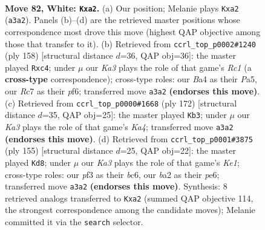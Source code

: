 \documentclass[11pt]{article}
\begin{document}
\clearpage

\begin{figure}[p]\centering
\begin{subfigure}{0.46\textwidth}\centering
\resizebox{\linewidth}{!}{%
\newchessgame
\chessboard[
  setfen={6k1/B1R5/r7/8/B3p2p/K4p1P/b4P2/8 w - - 74 82},
  showmover=false,
  pgfstyle=straightmove, color=movearrow, markmove={a3-a2}
]}
\caption{}
\end{subfigure}\hfill
\begin{subfigure}{0.46\textwidth}\centering
\resizebox{\linewidth}{!}{%
\newchessgame
\chessboard[
  setfen={2n5/8/rB3p2/P3k3/2b4p/7P/5K2/2R5 w - - 0 80},
  showmover=false,
  pgfstyle=straightmove, color=movearrow, markmove={c1-c4}
]}
\caption{}
\end{subfigure}
\\[4pt]
\begin{subfigure}{0.46\textwidth}\centering
\resizebox{\linewidth}{!}{%
\newchessgame
\chessboard[
  setfen={6k1/2R5/7p/6bP/KB2r1P1/8/8/8 w - - 1 87},
  showmover=false,
  pgfstyle=straightmove, color=movearrow, markmove={a4-b3}
]}
\caption{}
\end{subfigure}\hfill
\begin{subfigure}{0.46\textwidth}\centering
\resizebox{\linewidth}{!}{%
\newchessgame
\chessboard[
  setfen={4k3/6R1/1pB1P3/4p1b1/4P2p/6r1/2K5/8 b - - 9 78},
  showmover=false,
  pgfstyle=straightmove, color=movearrow, markmove={e8-d8}
]}
\caption{}
\end{subfigure}
\caption{\textbf{Move 82, White: \texttt{Kxa2}.} (a) Our position; Melanie plays \texttt{Kxa2} (\texttt{a3a2}). Panels (b)--(d) are the retrieved master positions whose correspondence most drove this move (highest QAP objective among those that transfer to it). (b) Retrieved from \texttt{ccrl\_top\_p0002\#1240} (ply 158) [structural distance $d$=36, QAP obj=36]: the master played \texttt{Rxc4}; under $\mu$ our \emph{Ka3} plays the role of that game's \emph{Rc1} (a \textbf{cross-type} correspondence); cross-type roles: our \emph{B}a4 as their \emph{P}a5, our \emph{R}c7 as their \emph{p}f6; transferred move \texttt{a3a2} \textbf{(endorses this move)}. (c) Retrieved from \texttt{ccrl\_top\_p0000\#1668} (ply 172) [structural distance $d$=35, QAP obj=25]: the master played \texttt{Kb3}; under $\mu$ our \emph{Ka3} plays the role of that game's \emph{Ka4}; transferred move \texttt{a3a2} \textbf{(endorses this move)}. (d) Retrieved from \texttt{ccrl\_top\_p0001\#3875} (ply 155) [structural distance $d$=25, QAP obj=22]: the master played \texttt{Kd8}; under $\mu$ our \emph{Ka3} plays the role of that game's \emph{Ke1}; cross-type roles: our \emph{p}f3 as their \emph{b}c6, our \emph{b}a2 as their \emph{p}e6; transferred move \texttt{a3a2} \textbf{(endorses this move)}. Synthesis: 8 retrieved analogs transferred to \texttt{Kxa2} (summed QAP objective 114, the strongest correspondence among the candidate moves); Melanie committed it via the \texttt{search} selector.}
\label{fig:thought-m162}
\end{figure}
\end{document}
